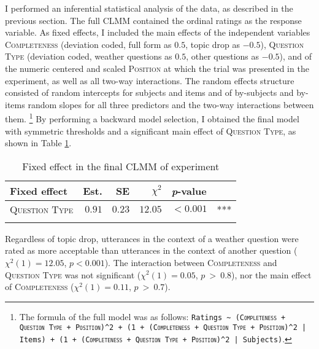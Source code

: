 I performed an inferential statistical analysis of the data, as described in the previous section.
The full CLMM contained the ordinal ratings as the response variable.
As fixed effects, I included the main effects of the independent variables \textsc{Completeness} (deviation coded, full form as $0.5$, topic drop as $-0.5$), \textsc{Question Type} (deviation coded, weather questions as $0.5$, other questions as $-0.5$), and of the numeric centered and scaled \textsc{Position} at which the trial was presented in the experiment, as well as all two-way interactions.
The random effects structure consisted of random intercepts for subjects and items and of by-subjects and by-items random slopes for all three predictors and the two-way interactions between them.%
\footnote{The formula of the full model was as follows:
\texttt{Ratings \textasciitilde~(\textsc{Completeness} + \textsc{Question Type} + \textsc{Position})\textasciicircum2 + (1 + (\textsc{Completeness} + \textsc{Question Type} + \textsc{Position})\textasciicircum2 | Items) + (1 + (\textsc{Completeness} + \textsc{Question Type} + \textsc{Position})\textasciicircum2 | Subjects)}.}
%
By performing a backward model selection, I obtained the final model with symmetric thresholds and a significant main effect of \textsc{Question Type}, as shown in Table \ref{tab:ex.model}.

\begin{table}
\caption{Fixed effect in the final CLMM of experiment }
\centering
\begin{tabular}{lrrrll}
\lsptoprule
Fixed effect & Est. & SE & $\chi^2$ & \textit{p}-value &   \\
\midrule
\textsc{Question Type} & $0.91$ & $0.23$ &  $12.05$ & $< 0.001$ & ***\\
\lspbottomrule
\end{tabular}
\label{tab:ex.model}
\end{table}

\noindent
Regardless of topic drop, utterances in the context of a weather question were rated as more acceptable than utterances in the context of another question ($\chi^2(1) = 12.05$, $p < 0.001$).
The interaction between \textsc{Completeness} and \textsc{Question Type} was not significant ($\chi^2(1) = 0.05$, $p~>~0.8$), nor the main effect of \textsc{Completeness} ($\chi^2(1) = 0.11$, $p~>~0.7$).

